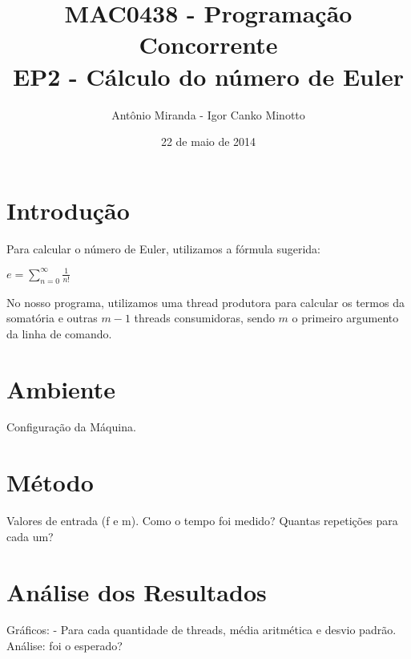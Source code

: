 \documentclass[a4paper,11pt]{article} %
\title{
	\vspace{0 mm}
	\huge{\textbf{MAC0438 - Programação Concorrente}} \\
	\vspace{3 mm}
	\huge{EP2 - Cálculo do número de Euler}
	\vspace{0 mm}
}
\author	{
	\Large{{ Antônio Miranda - Igor Canko Minotto}}	\\
}
\date{\Large{{ 22 de maio de 2014}}}
\begin{document}
\maketitle

\pagebreak 
\tableofcontents

\pagebreak
\setcounter{section}{-1}

\section{Introdução}
  Para calcular o número de Euler, utilizamos a fórmula sugerida: \linebreak 
  \centerline{ $e =\sum\limits_{n=0}^\infty \frac{1}{n!}$ } 
  No nosso programa, utilizamos uma thread produtora para calcular os termos da somatória e outras $m-1$ threads consumidoras, sendo $m$ o primeiro argumento da linha de comando. 
  
\section{Ambiente}
  Configuração da Máquina.
\section{Método}
  Valores de entrada (f e m).
  Como o tempo foi medido?	
  Quantas repetições para cada um?
\section{Análise dos Resultados}
  Gráficos:
    - Para cada quantidade de threads, média aritmética e desvio padrão.
  Análise: foi o esperado?
\end{document}
